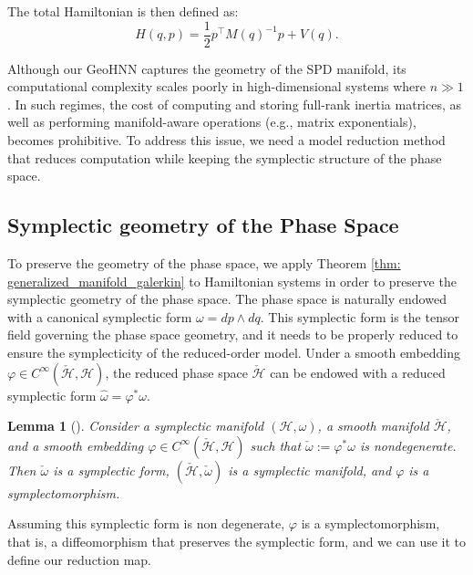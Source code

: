 \documentclass{article}
\theoremstyle{plain}
\newtheorem{lemma}[theorem]{Lemma}
\theoremstyle{definition}
\theoremstyle{remark}
\begin{document}
The total Hamiltonian is then defined as:
\[
    H(q, p) = \frac{1}{2} p^\top M(q)^{-1} p + V(q).
\]



Although our GeoHNN captures the geometry of the SPD manifold, its computational complexity scales poorly in high-dimensional systems where $n \gg 1$. In such regimes, the cost of computing and storing full-rank inertia matrices, as well as performing manifold-aware operations (e.g., matrix exponentials), becomes prohibitive. To address this issue, we need a model reduction method that reduces computation while keeping the symplectic structure of the phase space.

\subsection{Symplectic geometry of the Phase Space}
To preserve the geometry of the phase space, we apply Theorem \ref{thm: generalized_manifold_galerkin} to Hamiltonian systems in order to preserve the symplectic geometry of the phase space. The phase space is naturally endowed with a canonical symplectic form $\omega = dp \wedge dq$. This symplectic form is the tensor field governing the phase space geometry, and it needs to be properly reduced to ensure the symplecticity of the reduced-order model. Under a smooth embedding $\varphi \in C^{\infty}(\check{\mathcal{H}}, \mathcal{H})$, the reduced phase space $\check{\mathcal{H}}$ can be endowed with a reduced symplectic form $\hat{\omega} = \varphi^* \omega$.
\begin{lemma}[\cite{buchfink2024}]
\textit{Consider a symplectic manifold $(\mathcal{H}, \omega)$, a smooth manifold $\check{\mathcal{H}}$, and a smooth embedding $\varphi \in C^{\infty}(\check{\mathcal{H}}, \mathcal{H})$ such that $\check{\omega} := \varphi^* \omega$ is nondegenerate. Then $\check{\omega}$ is a symplectic form, $(\check{\mathcal{H}}, \check{\omega})$ is a symplectic manifold, and $\varphi$ is a symplectomorphism.}
\end{lemma}

Assuming this symplectic form is non degenerate, $\varphi$ is a symplectomorphism, that is, a diffeomorphism that preserves the symplectic form, and we can use it to define our reduction map.
\end{document}
